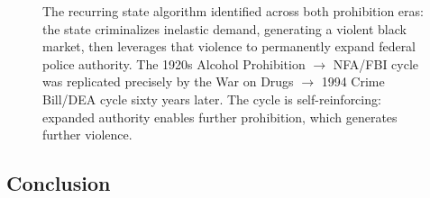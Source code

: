 \documentclass[
]{article}
\begin{document}
\begin{figure}[htbp]
\caption{The recurring state algorithm identified across both prohibition eras: the state criminalizes inelastic demand, generating a violent black market, then leverages that violence to permanently expand federal police authority. The 1920s Alcohol Prohibition $\rightarrow$ NFA/FBI cycle was replicated precisely by the War on Drugs $\rightarrow$ 1994 Crime Bill/DEA cycle sixty years later. The cycle is self-reinforcing: expanded authority enables further prohibition, which generates further violence.}
\label{fig:prohibition-algorithm}
\end{figure}

\subsection{\texorpdfstring{\textbf{Conclusion}}{Conclusion}}\label{conclusion}
\end{document}
